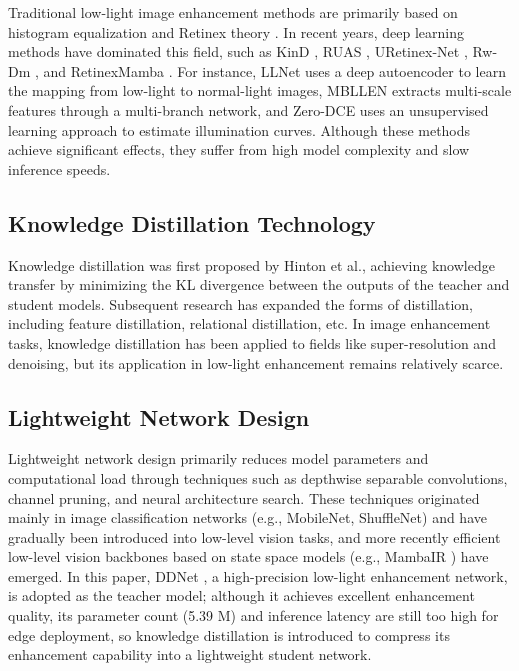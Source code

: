 \documentclass[sensors,article,submit,moreauthors]{Definitions/mdpi}
\begin{document}
Traditional low-light image enhancement methods are primarily based on histogram equalization \cite{ref28} and Retinex theory \cite{ref7}. In recent years, deep learning methods have dominated this field, such as KinD \cite{ref8}, RUAS \cite{ref9}, URetinex-Net \cite{ref10}, Rw-Dm \cite{ref6}, and RetinexMamba \cite{ref36}. For instance, LLNet uses a deep autoencoder to learn the mapping from low-light to normal-light images, MBLLEN extracts multi-scale features through a multi-branch network, and Zero-DCE \cite{ref26} uses an unsupervised learning approach to estimate illumination curves. Although these methods achieve significant effects, they suffer from high model complexity and slow inference speeds.

\subsection{Knowledge Distillation Technology}

Knowledge distillation was first proposed by Hinton et al., achieving knowledge transfer by minimizing the KL divergence between the outputs of the teacher and student models. Subsequent research has expanded the forms of distillation, including feature distillation, relational distillation, etc. In image enhancement tasks, knowledge distillation has been applied to fields like super-resolution and denoising, but its application in low-light enhancement remains relatively scarce.

\subsection{Lightweight Network Design}

Lightweight network design primarily reduces model parameters and computational load through techniques such as depthwise separable convolutions, channel pruning, and neural architecture search. These techniques originated mainly in image classification networks (e.g., MobileNet, ShuffleNet) and have gradually been introduced into low-level vision tasks, and more recently efficient low-level vision backbones based on state space models (e.g., MambaIR \cite{ref35}) have emerged. In this paper, DDNet \cite{ref25}, a high-precision low-light enhancement network, is adopted as the teacher model; although it achieves excellent enhancement quality, its parameter count (5.39 M) and inference latency are still too high for edge deployment, so knowledge distillation is introduced to compress its enhancement capability into a lightweight student network.
\end{document}
